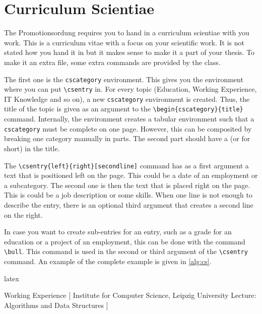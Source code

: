 \section{Curriculum Scientiae}%
\label{sec:cs}

The Promotionsordung \citep{web:promotion} requires you to hand in a
curriculum scientiae with you work.  This is a curriculum vitae with a focus
on your scientific work. It is not stated how you hand it in but it makes
sense to make it a part of your thesis. To make it an extra file, some extra
commands are provided by the class.

The first one is the \verb!cscategory! environment. This gives you the
environment where you can put \verb!\csentry! in. For every topic (Education,
Working Experience, IT Knowledge and so on), a new \verb!cscategory!
environment is created. Thus, the title of the topic is given as an argument to
the \verb!\begin{cscategory}{title}! command. Internally, the environment
creates a tabular environment such that a \verb!cscategory! must be complete
on one page.  However, this can be composited by breaking one category
manually in parts. The second part should have a  (or
 for short) in the title.

The \verb!\csentry{left}{right}[secondline]! command has as a first argument a
text that is positioned left on the page. This could be a date of an
employment or a subcategory. The second one is then the text that is placed
right on the page.  This is could be a job description or some skills. When
one line is not enough to describe the entry, there is an optional third
argument that creates a second line on the right.

In case you want to create sub-entries for an entry, such as a grade for an
education or a project of an employment, this can be done with the command
\verb|\bull|. This command is used in the second or third argument of the
\verb!\csentry! command. An example of the complete example is given in
\autoref{alg:cs}.

\begin{algorithm}
    \caption{An example how a curriculum scientiae is created.}%
    \label{alg:cs}
    \begin{code}{latex}
\begin{cscategory}{Working Experience}
    [
        Institute for Computer Science, Leipzig University
        \bull{} Lecture: Algorithms and Data Structures
    ]
\end{cscategory}
    \end{code}
\end{algorithm}

